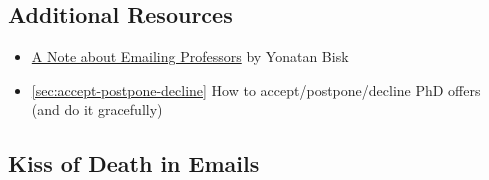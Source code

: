 \documentclass[oneside,11pt,dvipsnames]{book}
\begin{document}
\subsection*{Additional Resources}
\begin{itemize}
  \item \href{https://yonatanbisk.com/emailing_professors.html}{A Note about Emailing Professors} by Yonatan Bisk
  \item \autoref{sec:accept-postpone-decline} How to accept/postpone/decline PhD offers (and do it gracefully)
\end{itemize}


\subsection{Kiss of Death in Emails}\label{sec:kiss-of-death-emails}
\end{document}
